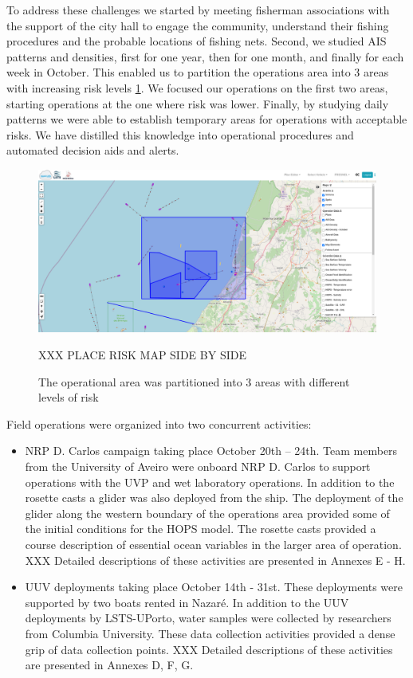 To address these challenges we started by meeting fisherman associations with the support of the city hall to engage the community, understand their fishing procedures and the probable locations of fishing nets. Second, we studied AIS patterns and densities, first for one year, then for one month, and finally for each week in October. This enabled us to partition the operations area into 3 areas with increasing risk levels \ref{fig:riskareas}. We focused our operations on the first two areas, starting operations at the one where risk was lower. Finally, by studying daily patterns we were able to establish temporary areas for operations with acceptable risks. We have distilled this knowledge into operational procedures and automated decision aids and alerts.

\begin{figure}
    \centering
    \includegraphics[width=.7\linewidth]{fig/riskareas.png}
    \caption{The operational area was partitioned into 3 areas with different levels of risk} XXX PLACE RISK MAP SIDE BY SIDE
    \label{fig:riskareas}
\end{figure}

Field operations were organized into two concurrent activities:

\begin{itemize}
    \item NRP D. Carlos campaign taking place October 20th – 24th. Team members from the University of Aveiro were onboard NRP D. Carlos to support operations with the UVP and wet laboratory operations. In addition to the rosette casts a glider was also deployed from the ship. The deployment of the glider along the western boundary of the operations area provided some of the initial conditions for the HOPS model. The rosette casts provided a course description of essential ocean variables in the larger area of operation. XXX Detailed descriptions of these activities are presented in Annexes E - H.
    \item UUV deployments taking place October 14th - 31st.  These deployments were supported by two boats rented in Nazaré. In addition to the UUV deployments by LSTS-UPorto, water samples were collected by researchers from Columbia University. These data collection activities provided a dense grip of data collection points. XXX Detailed descriptions of these activities are presented in Annexes D, F, G.
\end{itemize}


